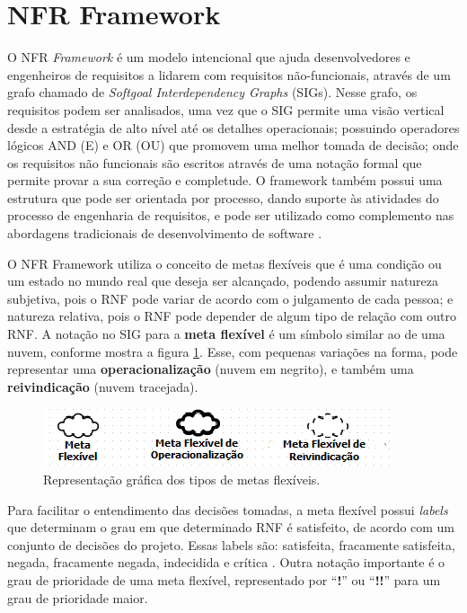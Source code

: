 \section{NFR Framework}
\label{sec:NFR}

O NFR \textit{Framework}  é um modelo intencional que ajuda desenvolvedores e engenheiros de requisitos a lidarem com requisitos não-funcionais, através de um grafo chamado de \textit{Softgoal Interdependency Graphs} (SIGs). Nesse grafo, os requisitos podem ser analisados, uma vez que o SIG permite uma visão vertical desde a estratégia de alto nível até os detalhes operacionais;  possuindo operadores lógicos AND (E) e OR (OU) que promovem uma melhor tomada de decisão; onde  os requisitos não funcionais são escritos através de uma notação formal que permite provar a sua correção e completude. O framework também possui uma estrutura que pode ser orientada por processo, dando suporte às atividades do processo de engenharia de requisitos, e pode ser utilizado como complemento nas abordagens tradicionais de desenvolvimento de software \cite{chung2012non}.

O NFR Framework utiliza o conceito de metas flexíveis que é uma condição ou um estado no mundo real que deseja ser alcançado, podendo assumir natureza subjetiva, pois o RNF pode variar de acordo com o julgamento de cada pessoa; e natureza relativa, pois o RNF pode depender de algum tipo de relação com outro RNF.  A notação no SIG para a \textbf{meta flexível} é um símbolo similar ao de uma nuvem, conforme mostra a figura \ref{fig01}. Esse, com pequenas variações na forma, pode representar uma \textbf{operacionalização} (nuvem em negrito), e também uma \textbf{reivindicação} (nuvem tracejada).

\begin{figure}[h]
	\centering
	\includegraphics[keepaspectratio=true,scale=0.9]{figuras/tiposDeSoftgoals.png}
	\caption{Representação gráfica dos tipos de metas flexíveis.}
	\label{fig01}
\end{figure} 

Para facilitar o entendimento das decisões tomadas, a meta flexível possui \textit{labels} que determinam o grau em que determinado RNF é satisfeito, de acordo com um conjunto de decisões do projeto. Essas labels são: satisfeita, fracamente satisfeita,  negada, fracamente negada, indecidida e crítica \cite{chung2012non}. Outra notação importante é o grau de prioridade de uma meta flexível, representado por “\textbf{!}” ou “\textbf{!!}” para um grau de prioridade maior.


